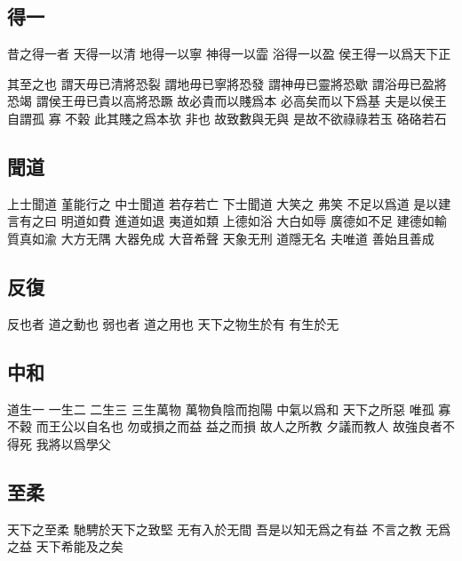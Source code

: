 \documentclass[a5paper,zihao=-4,oneside,UTF8]{ctexart}
\begin{document}
\subsection{得一}



昔之得一者 天得一以清 地得一以寧 神得一以霝 浴得一以盈 侯王得一以爲天下正

其至之也 謂天毋已清將恐裂 謂地毋已寧將恐發 謂神毋已靈將恐歇 謂浴毋已盈將恐竭 謂侯王毋已貴以高將恐蹶 
故必貴而以賤爲本 必高矣而以下爲基 
夫是以侯王自謂孤 寡 不榖 此其賤之爲本欤 非也 
故致數與无與 是故不欲祿祿若玉 硌硌若石




\subsection{聞道}



上士聞道 堇能行之 中士聞道 若存若亡 下士聞道 大笑之 弗笑 不足以爲道 
是以建言有之曰 明道如費 進道如退 夷道如類 上德如浴 大白如辱 廣德如不足 建德如輸 質真如渝 大方无隅 大器免成 大音希聲 天象无刑 道隱无名 
夫唯道 善始且善成




\subsection{反復}



反也者 道之動也 弱也者 道之用也 
天下之物生於有 有生於无 



\subsection{中和}



道生一 一生二 二生三 三生萬物 
萬物負陰而抱陽 中氣以爲和 
天下之所惡 唯孤 寡 不穀 而王公以自名也 
勿或損之而益 益之而損 故人之所教 夕議而教人   
故強良者不得死 我將以爲學父




\subsection{至柔}



天下之至柔 馳騁於天下之致堅 
无有入於无間 吾是以知无爲之有益 
不言之教 无爲之益 天下希能及之矣
\end{document}
